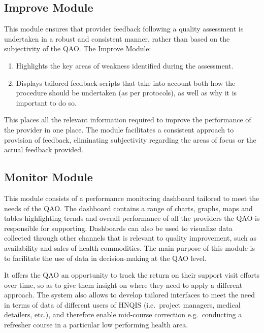 \documentclass[]{book}
\providecommand{\tightlist}{%
  \setlength{\itemsep}{0pt}\setlength{\parskip}{0pt}}
\begin{document}
\hypertarget{improve-module}{%
\subsection{Improve Module}\label{improve-module}}

This module ensures that provider feedback following a quality assessment is undertaken in a robust and consistent manner, rather than based on the subjectivity of the QAO. The Improve Module:

\begin{enumerate}
\def\labelenumi{\arabic{enumi}.}
\tightlist
\item
  Highlights the key areas of weakness identified during the assessment.
\item
  Displays tailored feedback scripts that take into account both how the procedure should be undertaken (as per protocols), as well as why it is important to do so.
\end{enumerate}

This places all the relevant information required to improve the performance of the provider in one place. The module facilitates a consistent approach to provision of feedback, eliminating subjectivity regarding the areas of focus or the actual feedback provided.

\hypertarget{monitor-module}{%
\subsection{Monitor Module}\label{monitor-module}}

This module consists of a performance monitoring dashboard tailored to meet the needs of the QAO. The dashboard contains a range of charts, graphs, maps and tables highlighting trends and overall performance of all the providers the QAO is responsible for supporting. Dashboards can also be used to visualize data collected through other channels that is relevant to quality improvement, such as availability and sales of health commodities. The main purpose of this module is to facilitate the use of data in decision-making at the QAO level.

It offers the QAO an opportunity to track the return on their support visit efforts over time, so as to give them insight on where they need to apply a different approach. The system also allows to develop tailored interfaces to meet the need in terms of data of different users of HNQIS (i.e.~project managers, medical detailers, etc.), and therefore enable mid-course correction e.g.~conducting a refresher course in a particular low performing health area.
\end{document}
